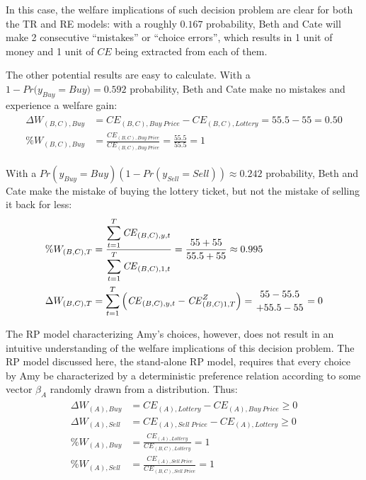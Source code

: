 \documentclass[11pt,a4paper]{report}
\newcommand\CE{\ensuremath{\mathit{CE}}}    %
\newcommand\Prob{\ensuremath{\mathit{Pr}}}  %
\begin{document}
In this case, the welfare implications of such decision problem are clear for both the TR and RE  models: with a roughly $0.167$ probability, Beth and Cate will make 2 consecutive \enquote{mistakes} or \enquote{choice errors}, which results in 1 unit of money and 1 unit of {\CE} being extracted from each of them.

The other potential results are easy to calculate.
With a ${1- {\Prob}(y_{\mathit{Buy}}} = \mathit{Buy}) = 0.592$ probability, Beth and Cate make no mistakes and experience a welfare gain:
\begin{align}
	\begin{split}
		\Delta W_{(B,C),\mathit{Buy}} &= {\CE}_{(B,C),\mathit{Buy\ Price}} - {\CE}_{(B,C),\mathit{Lottery}} = 55.5 - 55 = 0.50\\
		\% W_{(B,C),\mathit{Buy}} &= \frac{{\CE}_{(B,C),\mathit{Buy\ Price}}}{{\CE}_{(B,C),\mathit{Buy\ Price}}} = \frac{55.5}{55.5} = 1
	\end{split}
\end{align}

With a $ {\Prob}(y_{\mathit{Buy}} = \mathit{Buy})(1 - {\Prob}(y_{\mathit{Sell}}= \mathit{Sell})) \approx 0.242$ probability, Beth and Cate make the mistake of buying the lottery ticket, but not the mistake of selling it back for less:
\begin{align}
	\begin{split}
		\%W_{(B,C),T} &= \frac{\displaystyle\sum_{t=1}^{T} {\CE}_{(B,C),y,t} }{\displaystyle\sum_{t=1}^{T} {\CE}_{(B,C),1,t}} = \frac{55 + 55}{55.5 + 55} \approx 0.995 \\
		\Delta W_{(B,C),T} &= \sum_{t=1}^T \left( {\CE}_{(B,C),y,t} - {\CE}_{(B,C)1,T}^Z \right)= \genfrac{}{}{0pt}{}{55 - 55.5}{+ 55.5 - 55} = 0
	\end{split}
\end{align}

The RP model characterizing Amy's choices, however, does not result in an intuitive understanding of the welfare implications of this decision problem.
The RP model discussed here, the stand-alone RP model, requires that every choice by Amy be characterized by a deterministic preference relation according to some vector $\beta_A$ randomly drawn from a distribution.
Thus:
\begin{align}
	\label{eq2:RP.welfare}
	\begin{split}
		\Delta W_{(A),\mathit{Buy}} &= {\CE}_{(A),\mathit{Lottery}} - {\CE}_{(A),\mathit{Buy\ Price}} \geq 0\\
		\Delta W_{(A),\mathit{Sell}} &= {\CE}_{(A),\mathit{Sell\ Price}} - {\CE}_{(A),\mathit{Lottery}} \geq 0\\
		\% W_{(A),\mathit{Buy}} &= \frac{{\CE}_{(A),\mathit{Lottery}}}{{\CE}_{(B,C),\mathit{Lottery}}} = 1\\
		\% W_{(A),\mathit{Sell}} &= \frac{{\CE}_{(A),\mathit{Sell\ Price}}}{{\CE}_{(B,C),\mathit{Sell\ Price}}} = 1
	\end{split}
\end{align}
\end{document}
